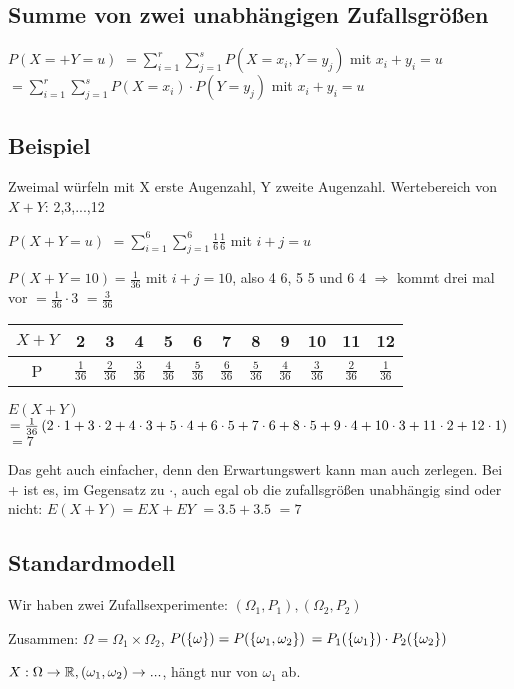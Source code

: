 \renewcommand{\ldate}{2015-11-30}

\subsection{Summe von zwei unabhängigen Zufallsgrößen}
$P(X=+Y=u)$
$=\sum_{i=1}^{r} \sum_{j=1}^{s} P(X=x_i, Y=y_j)$ mit $x_i + y_i = u$
$=\sum_{i=1}^{r} \sum_{j=1}^{s} P(X=x_i) \cdot P(Y=y_j)$ mit $x_i + y_i = u$

\subsection{Beispiel} 
Zweimal würfeln mit X erste Augenzahl, Y zweite Augenzahl. 
Wertebereich von $X+Y$: 2,3,...,12

$P(X+Y = u)$
$=\sum_{i=1}^{6} \sum_{j=1}^{6} \frac{1}{6} \frac{1}{6}$ mit $i+j=u$ 

$P(X+Y=10) = \frac{1}{36}$ mit $i+j=10$, also 4 6, 5 5 und 6 4 $\Rightarrow$ kommt drei mal vor
$=\frac{1}{36} \cdot 3 $
$=\frac{3}{36}$

\begin{tabular}{|c|c|c|c|c|c|c|c|c|c|c|c|}
\hline $X+Y$ & 2 & 3 & 4 & 5 & 6 & 7 & 8 & 9 & 10 & 11 & 12 \\ 
\hline P & $\frac{1}{36}$ & $\frac{2}{36}$ & $\frac{3}{36}$ & $\frac{4}{36}$ & $\frac{5}{36}$ & $\frac{6}{36}$ & $\frac{5}{36}$ & $\frac{4}{36}$ & $\frac{3}{36}$ & $\frac{2}{36}$ & $\frac{1}{36}$ \\ 
\hline 
\end{tabular} 

$E(X+Y)$
$=\frac{1}{36}  \left( 2\cdot 1 +  3\cdot 2+4\cdot 3+5\cdot 4+6\cdot 5+7\cdot 6+8\cdot 5+9\cdot 4+10\cdot 3 + 11\cdot 2 + 12\cdot 1 \right) $
$=7$

Das geht auch einfacher, denn den Erwartungswert kann man auch zerlegen. Bei + ist es, im Gegensatz zu $\cdot$, auch egal ob die zufallsgrößen unabhängig sind oder nicht: 
$E(X+Y) = EX + EY$
$=3.5+3.5$
$=7$

\subsection{Standardmodell}
Wir haben zwei Zufallsexperimente: $(\Omega_1,P_1), (\Omega_2,P_2)$

Zusammen: $\Omega = \Omega_1 \times \Omega_2$, 
$P( \left\lbrace \omega \right\rbrace ) = P( \left\lbrace \omega_1, \omega_2 \right\rbrace )$
$=P_1( \left\lbrace \omega_1 \right\rbrace ) \cdot P_2( \left\lbrace \omega_2 \right\rbrace )$

$X: \Omega \rightarrow \mathbb{R}, (\omega_1, \omega_2) \rightarrow ...$, hängt nur von $\omega_1$ ab.


